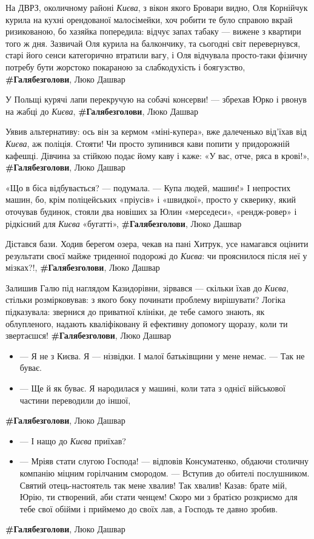 На ДВРЗ, околичному районі \emph{Києва}, з вікон якого Бровари видно, Оля Корнійчук
курила на кухні орендованої малосімейки, хоч робити те було справою вкрай
ризикованою, бо хазяйка попередила: відчує запах табаку — вижене з квартири
того ж дня. Зазвичай Оля курила на балкончику, та сьогодні світ перевернувся,
старі його сенси категорично втратили вагу, і Оля відчувала просто-таки фізичну
потребу бути жорстоко покараною за слабкодухість і боягузство,
\textbf{\#Галябезголови}, Люко Дашвар

У Польщі курячі лапи перекручую на собачі консерви! — збрехав Юрко і рвонув на
жабці до \emph{Києва},
\textbf{\#Галябезголови}, Люко Дашвар

Уявив альтернативу: ось він за кермом «міні-купера», вже далеченько від'їхав
від \emph{Києва}, аж поліція. Стояти! Чи просто зупинився кави попити у придорожній
кафешці. Дівчина за стійкою подає йому каву і каже: «У вас, отче, ряса в
крові!»,
\textbf{\#Галябезголови}, Люко Дашвар

«Що в біса відбувається? — подумала. — Купа людей, машин!» І непростих машин,
бо, крім поліцейських «пріусів» і «швидкої», просто у скверику, який оточував
будинок, стояли два новіших за Юлин «мерседеси», «рендж-ровер» і рідкісний для
\emph{Києва} «бугатті»,
\textbf{\#Галябезголови}, Люко Дашвар

Дістався бази. Ходив берегом озера, чекав на пані Хитрук, усе намагався оцінити
результати своєї майже триденної подорожі до \emph{Києва}: чи прояснилося після неї у
мізках?!, 
\textbf{\#Галябезголови}, Люко Дашвар

Залишив Галю під наглядом Казидорівни, зірвався — скільки їхав до \emph{Києва},
стільки розмірковував: з якого боку починати проблему вирішувати? Логіка
підказувала: звернися до приватної клініки, де тебе самого знають, як
облупленого, надають кваліфіковану й ефективну допомогу щоразу, коли ти
звертаєшся!  \textbf{\#Галябезголови}, Люко Дашвар

\begin{itemize}
\item — Я не з Києва. Я — нізвідки. І малої батьківщини у мене немає. — Так не буває.
\item — Ще й як буває. Я народилася у машині, коли тата з однієї
військової частини переводили до іншої,
\end{itemize}
\textbf{\#Галябезголови}, Люко Дашвар

\begin{itemize}
\item — І нащо до \emph{Києва} приїхав?
\item — Мріяв стати слугою Господа! — відповів Консуматенко, обдаючи столичну
        компанію міцним горілчаним смородом. — Вступив до обителі послушником.
        Святий отець-настоятель так мене хвалив! Так хвалив! Казав: брате мій,
        Юрію, ти створений, аби стати ченцем! Скоро ми з братією розкриємо для
        тебе свої обійми і приймемо до своїх лав, а Господь те давно зробив.
\end{itemize}
\textbf{\#Галябезголови}, Люко Дашвар

